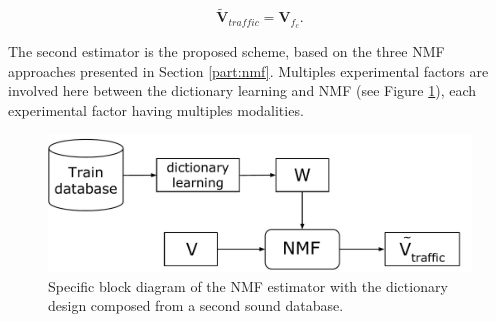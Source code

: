 \documentclass[twocolumn]{svjour3}          %
\begin{document}
\begin{equation}\label{eq:v_tr_filtered}
\mathbf{\tilde{V}}_{traffic} = \mathbf{V}_{f_c}.
\end{equation}

The second estimator is the proposed scheme, based on the three NMF approaches presented in Section \ref{part:nmf}. Multiples experimental factors are involved here between the dictionary learning and NMF (see Figure \ref{fig:bloc_nmf}), each experimental factor having multiples modalities.
\begin{figure}
    \centering
    \includegraphics[width=\linewidth]{figures/bloc_diagram_NMF_EN_2.pdf}
    \caption{Specific block diagram of the NMF estimator with the dictionary design composed from a second sound database.}
    \label{fig:bloc_nmf}
\end{figure}
\end{document}
